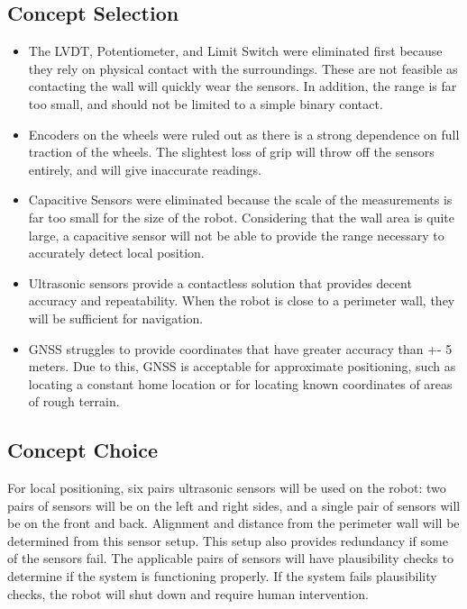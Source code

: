 \documentclass[12pt]{article}
\begin{document}
\subsection{Concept Selection}

\begin{itemize}
\setlength\itemsep{-0.5em}
\item The LVDT, Potentiometer, and Limit Switch were eliminated first because they rely on physical contact with the surroundings. These are not feasible as contacting the wall will quickly wear the sensors. In addition, the range is far too small, and should not be limited to a simple binary contact.

\item Encoders on the wheels were ruled out as there is a strong dependence on full traction of the wheels. The slightest loss of grip will throw off the sensors entirely, and will give inaccurate readings.

\item Capacitive Sensors were eliminated because the scale of the measurements is far too small for the size of the robot. Considering that the wall area is quite large, a capacitive sensor will not be able to provide the range necessary to accurately detect local position.

\item Ultrasonic sensors provide a contactless solution that provides decent accuracy and repeatability. When the robot is close to a perimeter wall, they will be sufficient for navigation.

\item GNSS struggles to provide coordinates that have greater accuracy than +- 5 meters. Due to this, GNSS is acceptable for approximate positioning, such as locating a constant home location or for locating known coordinates of areas of rough terrain. 
\end{itemize}

\subsection{Concept Choice}
For local positioning, six pairs ultrasonic sensors will be used on the robot: two pairs of sensors will be on the left and right sides, and a single pair of sensors will be on the front and back. Alignment and distance from the perimeter wall will be determined from this sensor setup. This setup also provides redundancy if some of the sensors fail. The applicable pairs of sensors will have plausibility checks to determine if the system is functioning properly. If the system fails plausibility checks, the robot will shut down and require human intervention.
\end{document}
